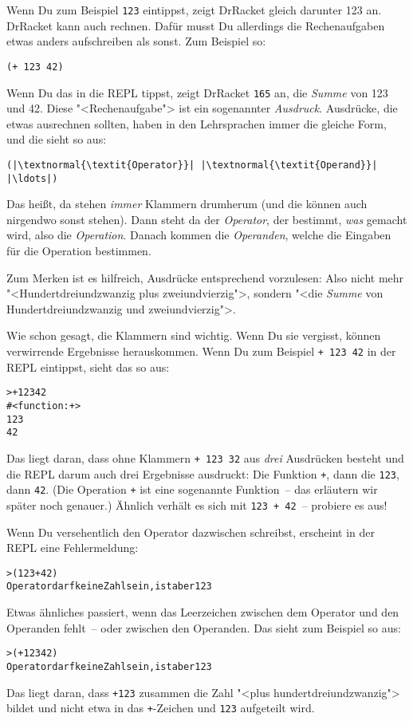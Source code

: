 Wenn Du zum Beispiel \lstinline{123} eintippst, zeigt DrRacket gleich
darunter 123 an.  DrRacket kann auch rechnen.  Dafür musst Du
allerdings die Rechenaufgaben etwas anders aufschreiben als sonst.
Zum Beispiel so:
%
\begin{lstlisting}
(+ 123 42)
\end{lstlisting}
%
Wenn Du das in die REPL tippst, zeigt DrRacket \lstinline{165} an, die
\textit{Summe} von 123 und 42.  Diese "<Rechenaufgabe">
ist ein sogenannter \textit{Ausdruck}.  Ausdrücke, die
etwas ausrechnen sollten, haben in den Lehrsprachen immer die gleiche
Form, und die sieht so aus:
%
\begin{lstlisting}
(|\textnormal{\textit{Operator}}| |\textnormal{\textit{Operand}}| |\ldots|)
\end{lstlisting}
%
Das heißt, da stehen \emph{immer} Klammern drumherum
(und die können auch nirgendwo sonst stehen).  Dann steht da der
\textit{Operator}, der bestimmt, \emph{was} gemacht
wird, also die \textit{Operation}.  Danach kommen die
\textit{Operanden}, welche die Eingaben
für die Operation bestimmen.

Zum Merken ist es hilfreich, Ausdrücke entsprechend vorzulesen: Also
nicht mehr "<Hundertdreiundzwanzig plus zweiundvierzig">, sondern
"<die \emph{Summe} von Hundertdreiundzwanzig und zweiundvierzig">.

Wie schon gesagt, die Klammern sind wichtig.  Wenn Du sie vergisst,
können verwirrende Ergebnisse herauskommen.  Wenn Du zum Beispiel
\lstinline{+ 123 42} in der REPL eintippst, sieht das so aus:
%
\begin{alltt}
> + {\color{green}123 42}
{\color{blue}#<function:+>
123
42}
\end{alltt}
%
Das liegt daran, dass ohne Klammern \lstinline{+ 123 32} aus \emph{drei}
Ausdrücken besteht und die REPL darum auch drei Ergebnisse ausdruckt:
Die Funktion \lstinline{+}, dann die \lstinline{123}, dann \lstinline{42}.
(Die Operation \lstinline{+} ist eine sogenannte Funktion~-- das
erläutern wir später noch genauer.)  Ähnlich verhält es sich mit
\lstinline{123 + 42}~-- probiere es aus!

Wenn Du versehentlich den Operator dazwischen schreibst, erscheint
in der REPL eine Fehlermeldung:
%
\begin{alltt}
> ({\color{green}123} + {\color{green}42})
{\color{red}Operator darf keine Zahl sein, ist aber 123}
\end{alltt}
%
Etwas ähnliches passiert, wenn das Leerzeichen zwischen dem
Operator und den Operanden fehlt~-- oder zwischen den Operanden.  Das
sieht zum Beispiel so aus:
%
\begin{alltt}
> ({\color{green}+123} {\color{green}42})
{\color{red}Operator darf keine Zahl sein, ist aber 123}
\end{alltt}
%
Das liegt daran, dass \lstinline{+123} zusammen die Zahl "<plus
hundertdreiundzwanzig"> bildet und nicht etwa in das \lstinline{+}-Zeichen und
\lstinline{123} aufgeteilt wird.

